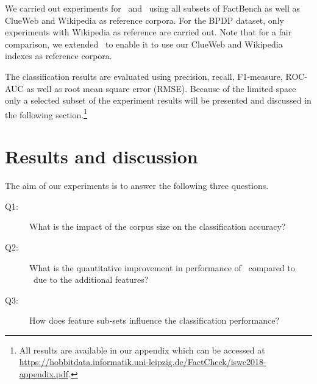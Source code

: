 We carried out experiments for \DeFacto\ and \FactCheck\ using all subsets of FactBench as well as ClueWeb and Wikipedia as reference corpora. For the BPDP dataset, only experiments with Wikipedia as reference are carried out. Note that for a fair comparison, we extended \DeFacto\ to enable it to use our ClueWeb and Wikipedia indexes as reference corpora.

The classification results are evaluated using precision, recall, F1-measure, ROC-AUC as well as root mean square error (RMSE). Because of the limited space only a selected subset of the experiment results will be presented and discussed in the following section.\footnote{All results are available in our appendix which can be accessed at \url{https://hobbitdata.informatik.uni-leipzig.de/FactCheck/iswc2018-appendix.pdf}.}

\section{Results and discussion}
\label{sec:results}

The aim of our experiments is to answer the following three questions.
\begin{description}
 \item[Q1:] What is the impact of the corpus size on the classification accuracy?
 \item[Q2:] What is the quantitative improvement in performance of \FactCheck\ compared to \DeFacto\ due to the additional features?
 \item[Q3:] How does feature sub-sets influence the classification performance?
\end{description}

